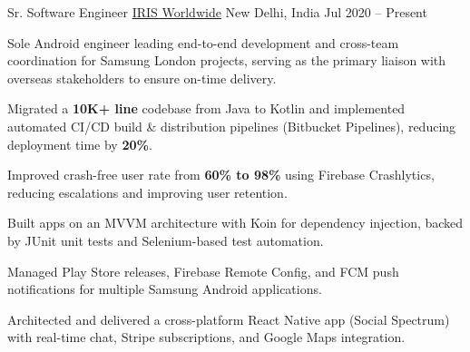

\begin{cventries}

  \cventry
    {Sr. Software Engineer} %
    {\href{https://www.iris-worldwide.com}{IRIS Worldwide}} %
    {New Delhi, India} %
    {Jul 2020 -- Present} %
    {
      \begin{cvitems} %
        \item {Sole Android engineer leading end-to-end development and cross-team coordination for Samsung London projects, serving as the primary liaison with overseas stakeholders to ensure on-time delivery.}
        \item {Migrated a \textbf{10K+ line} codebase from Java to Kotlin and implemented automated CI/CD build \& distribution pipelines (Bitbucket Pipelines), reducing deployment time by \textbf{20\%}.}
        \item {Improved crash-free user rate from \textbf{60\% to 98\%} using Firebase Crashlytics, reducing escalations and improving user retention.}
        \item {Built apps on an MVVM architecture with Koin for dependency injection, backed by JUnit unit tests and Selenium-based test automation.}
        \item {Managed Play Store releases, Firebase Remote Config, and FCM push notifications for multiple Samsung Android applications.}
        \item {Architected and delivered a cross-platform React Native app (Social Spectrum) with real-time chat, Stripe subscriptions, and Google Maps integration.}
      \end{cvitems}
    }
\vspace{0.4cm}


\end{cventries}
